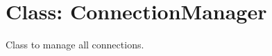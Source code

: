 %
%

\hypertarget{qconnectbase---init---class-connectionmanager-1}{%
\section{Class: ConnectionManager}\label{qconnectbase---init---class-connectionmanager-1}}

\begin{Shaded}
\begin{Highlighting}[]
\end{Highlighting}
\end{Shaded}

Class to manage all connections.
